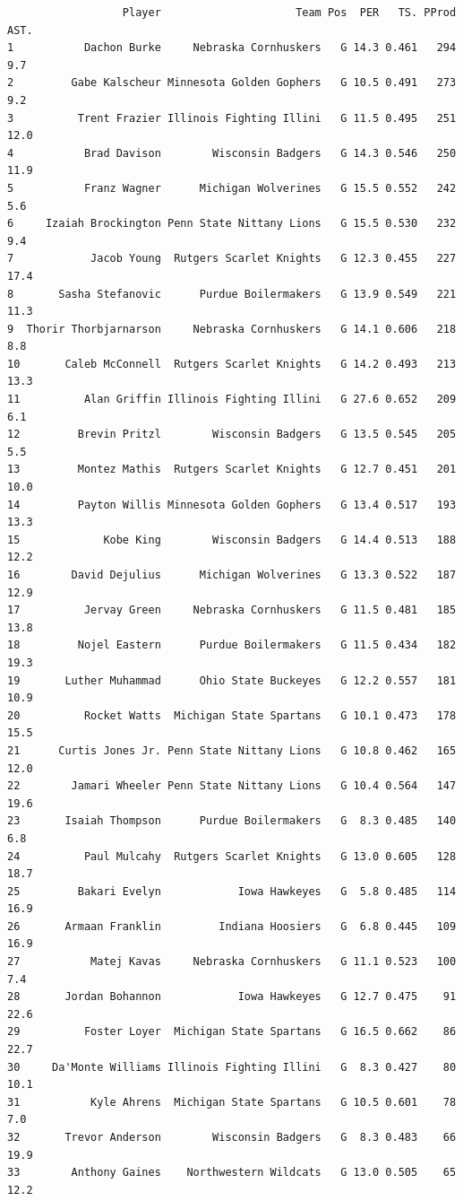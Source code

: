 \documentclass[
  letterpaper,
  DIV=11,
  numbers=noendperiod]{scrreprt}
\begin{document}
\begin{verbatim}
                  Player                     Team Pos  PER   TS. PProd AST.
1           Dachon Burke     Nebraska Cornhuskers   G 14.3 0.461   294  9.7
2         Gabe Kalscheur Minnesota Golden Gophers   G 10.5 0.491   273  9.2
3          Trent Frazier Illinois Fighting Illini   G 11.5 0.495   251 12.0
4           Brad Davison        Wisconsin Badgers   G 14.3 0.546   250 11.9
5           Franz Wagner      Michigan Wolverines   G 15.5 0.552   242  5.6
6     Izaiah Brockington Penn State Nittany Lions   G 15.5 0.530   232  9.4
7            Jacob Young  Rutgers Scarlet Knights   G 12.3 0.455   227 17.4
8       Sasha Stefanovic      Purdue Boilermakers   G 13.9 0.549   221 11.3
9  Thorir Thorbjarnarson     Nebraska Cornhuskers   G 14.1 0.606   218  8.8
10       Caleb McConnell  Rutgers Scarlet Knights   G 14.2 0.493   213 13.3
11          Alan Griffin Illinois Fighting Illini   G 27.6 0.652   209  6.1
12         Brevin Pritzl        Wisconsin Badgers   G 13.5 0.545   205  5.5
13         Montez Mathis  Rutgers Scarlet Knights   G 12.7 0.451   201 10.0
14         Payton Willis Minnesota Golden Gophers   G 13.4 0.517   193 13.3
15             Kobe King        Wisconsin Badgers   G 14.4 0.513   188 12.2
16        David Dejulius      Michigan Wolverines   G 13.3 0.522   187 12.9
17          Jervay Green     Nebraska Cornhuskers   G 11.5 0.481   185 13.8
18         Nojel Eastern      Purdue Boilermakers   G 11.5 0.434   182 19.3
19       Luther Muhammad      Ohio State Buckeyes   G 12.2 0.557   181 10.9
20          Rocket Watts  Michigan State Spartans   G 10.1 0.473   178 15.5
21      Curtis Jones Jr. Penn State Nittany Lions   G 10.8 0.462   165 12.0
22        Jamari Wheeler Penn State Nittany Lions   G 10.4 0.564   147 19.6
23       Isaiah Thompson      Purdue Boilermakers   G  8.3 0.485   140  6.8
24          Paul Mulcahy  Rutgers Scarlet Knights   G 13.0 0.605   128 18.7
25         Bakari Evelyn            Iowa Hawkeyes   G  5.8 0.485   114 16.9
26       Armaan Franklin         Indiana Hoosiers   G  6.8 0.445   109 16.9
27           Matej Kavas     Nebraska Cornhuskers   G 11.1 0.523   100  7.4
28       Jordan Bohannon            Iowa Hawkeyes   G 12.7 0.475    91 22.6
29          Foster Loyer  Michigan State Spartans   G 16.5 0.662    86 22.7
30     Da'Monte Williams Illinois Fighting Illini   G  8.3 0.427    80 10.1
31           Kyle Ahrens  Michigan State Spartans   G 10.5 0.601    78  7.0
32       Trevor Anderson        Wisconsin Badgers   G  8.3 0.483    66 19.9
33        Anthony Gaines    Northwestern Wildcats   G 13.0 0.505    65 12.2

\end{verbatim}
\end{document}

